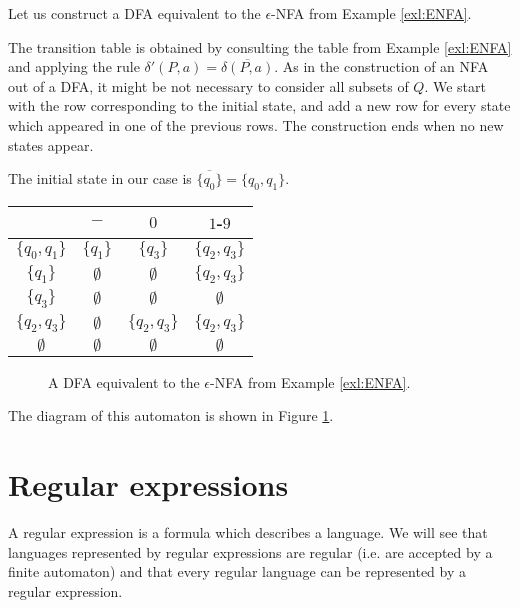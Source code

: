 \begin{page}
\setcounter{section}{1}
\setcounter{subsection}{4}
\setcounter{dfn}{17}
\label{portion:1067}

\begin{exl}
Let us construct a DFA equivalent to the $\epsilon$-NFA from Example \ref{exl:ENFA}.

The transition table is obtained by consulting the table from Example \ref{exl:ENFA}
and applying the rule $\delta'(P, a) = \overline{\delta(P, a)}$.
As in the construction of an NFA out of a DFA, it might be not necessary to consider all subsets of $Q$.
We start with the row corresponding to the initial state,
and add a new row for every state which appeared in one of the previous rows.
The construction ends when no new states appear.

The initial state in our case is $\overline{\{q_0\}} = \{q_0, q_1\}$.
\begin{center}
\begin{tabular}{c|ccc}
& $-$ & $0$ & $1$-$9$\\\hline
$\{q_0, q_1\}$ & $\{q_1\}$ & $\{q_3\}$ & $\{q_2, q_3\}$\\
$\{q_1\}$ & $\emptyset$ & $\emptyset$ & $\{q_2, q_3\}$\\
$\{q_3\}$ & $\emptyset$ & $\emptyset$ & $\emptyset$\\
$\{q_2, q_3\}$ & $\emptyset$ & $\{q_2, q_3\}$ & $\{q_2, q_3\}$\\
$\emptyset$ & $\emptyset$ & $\emptyset$ & $\emptyset$
\end{tabular}
\end{center}

\begin{figure}[ht]
\begin{center}

\end{center}
\caption{A DFA equivalent to the $\epsilon$-NFA from Example \ref{exl:ENFA}.}
\label{fig:DFAFromENFA}
\end{figure}

The diagram of this automaton is shown in Figure \ref{fig:DFAFromENFA}.
\end{exl}

\end{page}

\begin{page}
\setcounter{section}{2}
\setcounter{subsection}{1}
\setcounter{dfn}{0}
\label{portion:1070}

\section{Regular expressions}
A regular expression is a formula which describes a language.
We will see that languages represented by regular expressions are regular (i.e. are accepted by a finite automaton)
and that every regular language can be represented by a regular expression.


\end{page}

